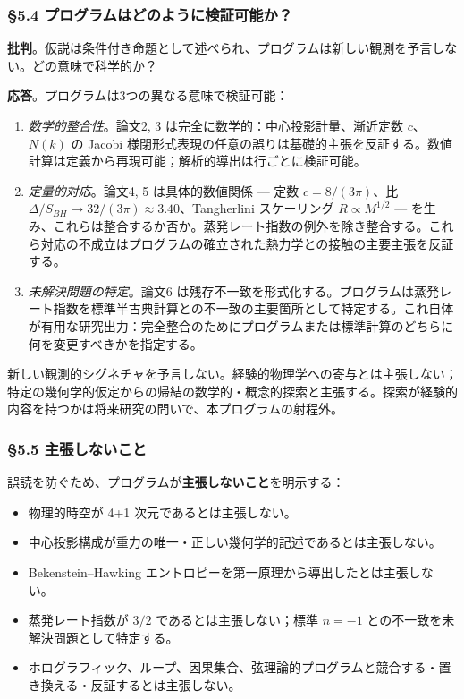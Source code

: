 \documentclass[a4paper,11pt]{ltjsarticle}
\theoremstyle{definition}
\providecommand{\tightlist}{\setlength{\itemsep}{0pt}\setlength{\parskip}{0pt}}
\begin{document}
\subsubsection{§5.4
プログラムはどのように検証可能か？}\label{ux30d7ux30edux30b0ux30e9ux30e0ux306fux3069ux306eux3088ux3046ux306bux691cux8a3cux53efux80fdux304b}

\textbf{批判}。仮説は条件付き命題として述べられ、プログラムは新しい観測を予言しない。どの意味で科学的か？

\textbf{応答}。プログラムは3つの異なる意味で検証可能：

\begin{enumerate}
\def\labelenumi{\arabic{enumi}.}
\item
  \emph{数学的整合性}。論文2, 3 は完全に数学的：中心投影計量、漸近定数
  \(c\)、\(N(k)\) の Jacobi
  様閉形式表現の任意の誤りは基礎的主張を反証する。数値計算は定義から再現可能；解析的導出は行ごとに検証可能。
\item
  \emph{定量的対応}。論文4, 5 は具体的数値関係 --- 定数
  \(c = 8/(3\pi)\)、比
  \(\Delta/S_{BH} \to 32/(3\pi) \approx 3.40\)、Tangherlini スケーリング
  \(R \propto M^{1/2}\) ---
  を生み、これらは整合するか否か。蒸発レート指数の例外を除き整合する。これら対応の不成立はプログラムの確立された熱力学との接触の主要主張を反証する。
\item
  \emph{未解決問題の特定}。論文6
  は残存不一致を形式化する。プログラムは蒸発レート指数を標準半古典計算との不一致の主要箇所として特定する。これ自体が有用な研究出力：完全整合のためにプログラムまたは標準計算のどちらに何を変更すべきかを指定する。
\end{enumerate}

新しい観測的シグネチャを予言しない。経験的物理学への寄与とは主張しない；特定の幾何学的仮定からの帰結の数学的・概念的探索と主張する。探索が経験的内容を持つかは将来研究の問いで、本プログラムの射程外。

\subsubsection{\texorpdfstring{§5.5
主張\textbf{しないこと}}{§5.5 主張しないこと}}\label{ux4e3bux5f35ux3057ux306aux3044ux3053ux3068}

誤読を防ぐため、プログラムが\textbf{主張しないこと}を明示する：

\begin{itemize}
\tightlist
\item
  物理的時空が 4+1 次元であるとは主張しない。
\item
  中心投影構成が重力の唯一・正しい幾何学的記述であるとは主張しない。
\item
  Bekenstein--Hawking エントロピーを第一原理から導出したとは主張しない。
\item
  蒸発レート指数が \(3/2\) であるとは主張しない；標準 \(n = -1\)
  との不一致を未解決問題として特定する。
\item
  ホログラフィック、ループ、因果集合、弦理論的プログラムと競合する・置き換える・反証するとは主張しない。
\end{itemize}
\end{document}

